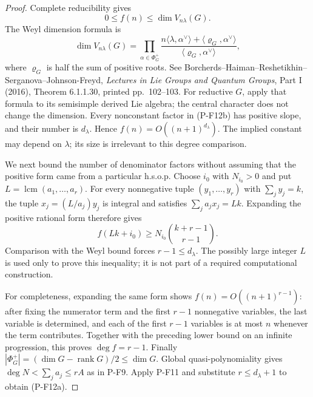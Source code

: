 \begin{proof}
Complete reducibility gives
\[
 0\le f(n)\le\dim V_{n\lambda}(G).
\]
The Weyl dimension formula is
\[
 \dim V_{n\lambda}(G)
 =\prod_{\alpha\in\Phi_G^+}
   \frac{n\langle\lambda,\alpha^\vee\rangle
             +\langle\varrho_G,\alpha^\vee\rangle}
        {\langle\varrho_G,\alpha^\vee\rangle},
 \tag{P-F12b}
\]
where $\varrho_G$ is half the sum of positive roots. See
Borcherds--Haiman--Reshetikhin--Serganova--Johnson-Freyd,
\emph{Lectures in Lie Groups and Quantum Groups}, Part I (2016),
Theorem 6.1.1.30, printed pp.~102--103.
For reductive $G$, apply that formula to its semisimple derived Lie
algebra; the central character does not change the dimension.
Every nonconstant factor in (P-F12b) has positive slope, and their
number is $d_\lambda$. Hence $f(n)=O((n+1)^{d_\lambda})$.
The implied constant may depend on $\lambda$; its size is irrelevant to
this degree comparison.

We next bound the number of denominator factors without assuming that
the positive form came from a particular h.s.o.p. Choose $i_0$ with
$N_{i_0}>0$ and put $L=\operatorname{lcm}(a_1,\ldots,a_r)$.
For every nonnegative tuple $(y_1,\ldots,y_r)$ with $\sum_jy_j=k$,
the tuple $x_j=(L/a_j)y_j$ is integral and satisfies
$\sum_ja_jx_j=Lk$. Expanding the positive rational form therefore gives
\[
 f(Lk+i_0)\ge N_{i_0}\binom{k+r-1}{r-1}.
\]
Comparison with the Weyl bound forces $r-1\le d_\lambda$.
The possibly large integer $L$ is used only to prove this inequality;
it is not part of a required computational construction.

For completeness, expanding the same form shows
$f(n)=O((n+1)^{r-1})$: after fixing the numerator term and the first
$r-1$ nonnegative variables, the last variable is determined, and each
of the first $r-1$ variables is at most $n$ whenever the term contributes.
Together with the preceding lower bound on an infinite progression,
this proves $\deg f=r-1$. Finally
$|\Phi_G^+|=(\dim G-\operatorname{rank}G)/2\le\dim G$.
Global quasi-polynomiality gives
$\deg N<\sum_ja_j\le rA$ as in P-F9. Apply P-F11 and substitute
$r\le d_\lambda+1$ to obtain (P-F12a).


\end{proof}
